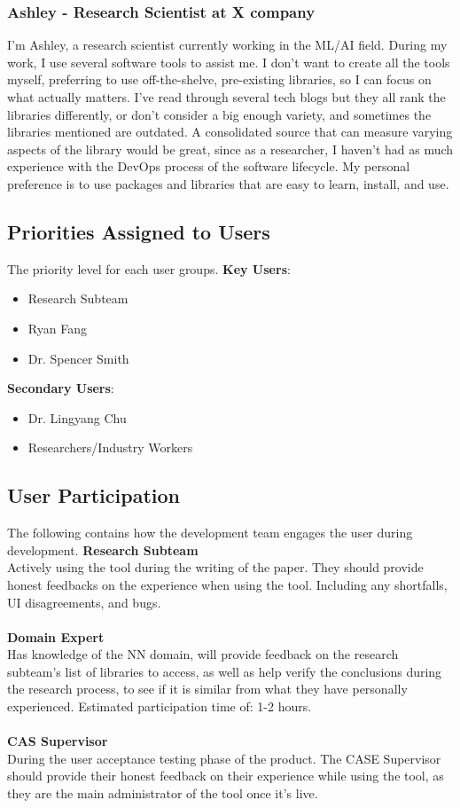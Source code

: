 \documentclass[12pt]{article}
\begin{document}
\subsubsection{Ashley - Research Scientist at X company}
I’m Ashley, a research scientist currently working in the ML/AI field. During my work, I use several software tools to assist me. I don’t want to create all the tools myself, preferring to use off-the-shelve, pre-existing libraries, so I can focus on what actually matters. I’ve read through several tech blogs but they all rank the libraries differently, or don’t consider a big enough variety, and sometimes the libraries mentioned are outdated. A consolidated source that can measure varying aspects of the library would be great, since as a researcher, I haven’t had as much experience with the DevOps process of the software lifecycle. My personal preference is to use packages and libraries that are easy to learn, install, and use.
\subsection{Priorities Assigned to Users}
The priority level for each user groups.
\textbf{Key Users}:
\begin{itemize}
\item Research Subteam
\item Ryan Fang
\item Dr. Spencer Smith
\end{itemize}
\textbf{Secondary Users}:
\begin{itemize}
\item Dr. Lingyang Chu
\item Researchers/Industry Workers
\end{itemize}

\subsection{User Participation}
The following contains how the development team engages the user during development.
\textbf{Research Subteam} \\
Actively using the tool during the writing of the paper. They should provide honest feedbacks on the experience when using the tool. Including any shortfalls, UI disagreements, and bugs.\\\\
\textbf{Domain Expert} \\
Has knowledge of the NN domain, will provide feedback on the research subteam’s list of libraries to access, as well as help verify the conclusions during the research process, to see if it is similar from what they have personally experienced. Estimated participation time of: 1-2 hours.
\\\\\textbf{CAS Supervisor} \\
During the user acceptance testing phase of the product. The CASE Supervisor should provide their honest feedback on their experience while using the tool, as they are the main administrator of the tool once it's live.
\end{document}
